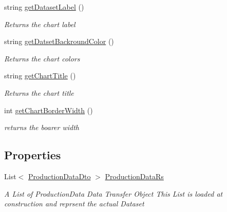 \begin{DoxyCompactItemize}
string \hyperlink{classkpi_mvc_api_1_1_data_transfer_objects_1_1_production_data_dto_rs_a00fbb03b6dab63ddc0076349fcf419b3}{get\+Dataset\+Label} ()
\begin{DoxyCompactList}\small\item\em Returns the chart label \end{DoxyCompactList}\item 
string \hyperlink{classkpi_mvc_api_1_1_data_transfer_objects_1_1_production_data_dto_rs_a6bf08aafc72411a608bd747f86a7fab9}{get\+Datset\+Backround\+Color} ()
\begin{DoxyCompactList}\small\item\em Returns the chart colors \end{DoxyCompactList}\item 
string \hyperlink{classkpi_mvc_api_1_1_data_transfer_objects_1_1_production_data_dto_rs_aafbcb529de90cca6265eb5c3302e3bd0}{get\+Chart\+Title} ()
\begin{DoxyCompactList}\small\item\em Returns the chart title \end{DoxyCompactList}\item 
int \hyperlink{classkpi_mvc_api_1_1_data_transfer_objects_1_1_production_data_dto_rs_ab2c12e10d53b8ef8e467ed92313eed82}{get\+Chart\+Border\+Width} ()
\begin{DoxyCompactList}\small\item\em returns the boarer width \end{DoxyCompactList}\end{DoxyCompactItemize}
\subsection*{Properties}
\begin{DoxyCompactItemize}
\item 
List$<$ \hyperlink{classkpi_mvc_api_1_1_data_transfer_objects_1_1_production_data_dto}{Production\+Data\+Dto} $>$ \hyperlink{classkpi_mvc_api_1_1_data_transfer_objects_1_1_production_data_dto_rs_a4f6705f015bff504dffa7567f1df1296}{Production\+Data\+Rs}
\begin{DoxyCompactList}\small\item\em A List of Production\+Data Data Transfer Object This List is loaded at construction and reprsent the actual Dataset \end{DoxyCompactList}\end{DoxyCompactItemize}


